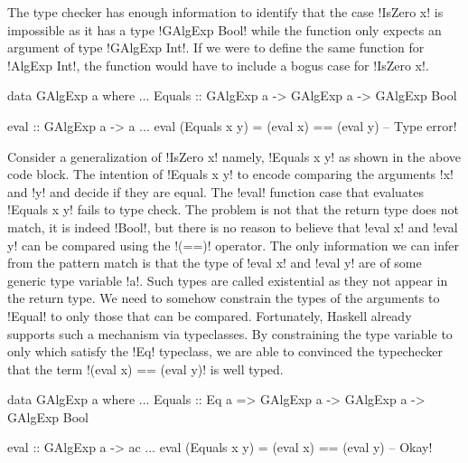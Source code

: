 \documentclass[screen,nonacm]{acmart}
\begin{document}
The type checker has enough information to identify that the case !IsZero x! is impossible as it has a type !GAlgExp Bool! while the function only expects an argument of type !GAlgExp Int!. If we were to define the same function for !AlgExp Int!, the function would have to include a bogus case for !IsZero x!.

\begin{minipage}[ht]{0.5\linewidth}
\begin{code}
data GAlgExp a where
  ...
  Equals :: GAlgExp a -> GAlgExp a -> GAlgExp Bool
\end{code}
\end{minipage}%
\begin{minipage}[ht]{0.4\linewidth}
\begin{code}
eval :: GAlgExp a -> a
...
eval (Equals x y) = (eval x) == (eval y) -- Type error!
\end{code}
\end{minipage}

Consider a generalization of !IsZero x! namely, !Equals x y! as shown in the above code block. The intention of !Equals x y! to encode comparing the arguments !x! and !y! and decide if they are equal. The !eval! function case that evaluates !Equals x y! fails to type check. The problem is not that the return type does not match, it is indeed !Bool!, but there is no reason to believe that !eval x! and !eval y! can be compared using the !(==)! operator. The only information we can infer from the pattern match is that the type of !eval x! and !eval y! are of some generic type variable !a!. Such types are called existential as they not appear in the return type. We need to somehow constrain the types of the arguments to !Equal! to only those that can be compared. Fortunately, Haskell already supports such a mechanism via typeclasses. By constraining the type variable to only which satisfy the !Eq! typeclass, we are able to convinced the typechecker that the term !(eval x) == (eval y)! is well typed.

\begin{minipage}[ht]{0.5\linewidth}
\begin{code}
data GAlgExp a where
...
   Equals :: Eq a => GAlgExp a -> GAlgExp a
                  -> GAlgExp Bool
\end{code}
\end{minipage}%
\begin{minipage}[ht]{0.4\linewidth}
\begin{code}
eval :: GAlgExp a -> ac
...
eval (Equals x y) = (eval x) == (eval y) -- Okay!
\end{code}
\end{minipage}
\end{document}
